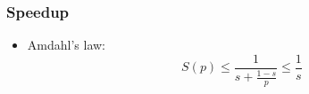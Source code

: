 \begin{frame}[fragile]
%
  \frametitle{Speedup}
%
  \begin{itemize}
%
  \item Amdahl's law:
    \[
    S(p) \leq \frac{1}{s+\frac{1-s}{p}} \leq \frac{1}{s}
    \]
%
  \end{itemize}
%
\end{frame}

